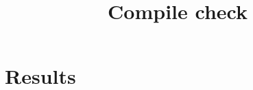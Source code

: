 \documentclass[conference]{IEEEtran}
\begin{document}
\title{Compile check}
\author{}
\maketitle

\section{Results}

\end{document}
